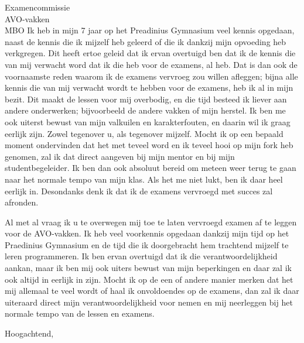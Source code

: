\documentclass{letter}
\begin{document}
\begin{letter}{Examencommissie \\ AVO-vakken \\ MBO}
Ik heb in mijn 7 jaar op het Preadinius Gymnasium veel kennis opgedaan, naast de kennis die ik mijzelf
heb geleerd of die ik dankzij mijn opvoeding heb verkgregen. Dit heeft ertoe geleid dat ik ervan 
overtuigd ben dat ik de kennis die van mij verwacht word dat ik die heb voor de examens, al heb.
Dat is dan ook de voornaamste reden waarom ik de examens vervroeg zou willen afleggen; bijna alle
kennis die van mij verwacht wordt te hebben voor de examens, heb ik al in mijn bezit. Dit maakt 
de lessen voor mij overbodig, en die tijd besteed ik liever aan andere onderwerken; bijvoorbeeld
de andere vakken of mijn herstel. Ik ben me ook uiterst bewust van mijn valkuilen en karakterfouten,
en daarin wil ik graag eerlijk zijn. Zowel tegenover u, als tegenover mijzelf. Mocht ik op een bepaald
moment ondervinden dat het met teveel word en ik teveel hooi op mijn fork heb genomen, zal ik dat direct
aangeven bij mijn mentor en bij mijn studentbegeleider. Ik ben dan ook absoluut bereid om meteen weer
terug te gaan naar het normale tempo van mijn klas. Als het me niet lukt, ben ik daar heel eerlijk in.
Desondanks denk ik dat ik de examens vervroegd met succes zal afronden.


Al met al vraag ik u te overwegen mij toe te laten vervroegd examen af te leggen voor de AVO-vakken. Ik heb veel voorkennis
opgedaan dankzij mijn tijd op het Praedinius Gymnasium en de tijd die ik doorgebracht hem trachtend mijzelf te leren
programmeren. Ik ben ervan overtuigd dat ik die verantwoordelijkheid aankan, maar ik ben mij ook uiters bewust
van mijn beperkingen en daar zal ik ook altijd in eerlijk in zijn. Mocht ik op de een of andere manier merken 
dat het mij allemaal te veel wordt of haal ik onvoldoendes op de examens, dan zal ik daar uiteraard direct 
mijn verantwoordelijkheid voor nemen en mij neerleggen bij het normale tempo van de lessen en examens.
\closing{Hoogachtend,}

\end{letter}
\end{document}
